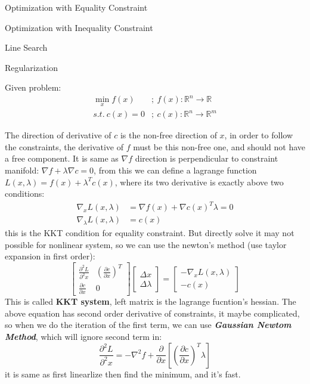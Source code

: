 \documentclass[10pt]{elegantbook}
\newcommand{\mydefination}[1]{\textbf{\textit{\textcolor{structurecolor}{#1}}}}
\begin{document}
\begin{introduction}
    \item Optimization with Equality Constraint
    \item Optimization with Inequality Constraint
    \item Line Search
    \item Regularization
\end{introduction}

Given problem:
\begin{align*}
    \min_x f(x) &; ~ f(x): \mathbb R^n \rightarrow \mathbb R \\
    s.t. ~ c(x) = 0 &; ~ c(x):\mathbb R^n \rightarrow \mathbb R^m
\end{align*}

The direction of derivative of $c$ is the non-free direction of $x$, in order to follow the constraints, 
the derivative of $f$ must be this non-free one, and should not have a free component. It is same as $\nabla f$
direction is perpendicular to constraint manifold: $\nabla f + \lambda \nabla c = 0$, from this we can define a 
lagrange function $L(x, \lambda) = f(x) + \lambda^Tc(x)$, where its two derivative is exactly above two conditions:
\begin{equation} \label{eq:equality_kkt}
\begin{aligned}
    \nabla_x L(x, \lambda) &= \nabla f(x) + \nabla c(x)^T\lambda = 0 \\
    \nabla_{\lambda} L(x, \lambda) &= c(x)
\end{aligned}
\end{equation}
this is the KKT condition for equality constraint. But directly solve it may not possible for nonlinear system, so 
we can use the newton's method (use taylor expansion in first order):
\begin{equation}
\begin{bmatrix}
    \frac{\partial^2 L}{\partial^2 x} & (\frac{\partial c}{\partial x})^T \\
    \frac{\partial c}{\partial x} & 0
\end{bmatrix}
\begin{bmatrix}
    \Delta x \\
    \Delta \lambda
\end{bmatrix}
=
\begin{bmatrix}
    -\nabla_x L(x, \lambda) \\
    -c(x)
\end{bmatrix}
\end{equation}
This is called \textbf{KKT system}, left matrix is the lagrange fucntion's hessian. The above equation has second order
derivative of constraints, it maybe complicated, so when we do the iteration of the first term, we can use \mydefination{
Gaussian Newtom Method}, which will ignore second term in:
\[\frac{\partial^2 L}{\partial^2 x} = -\nabla^2 f + \frac{\partial}{\partial x} [(\frac{\partial c}{\partial x})^T \lambda] \]
it is same as first linearlize then find the minimum, and it's fast.
\end{document}
